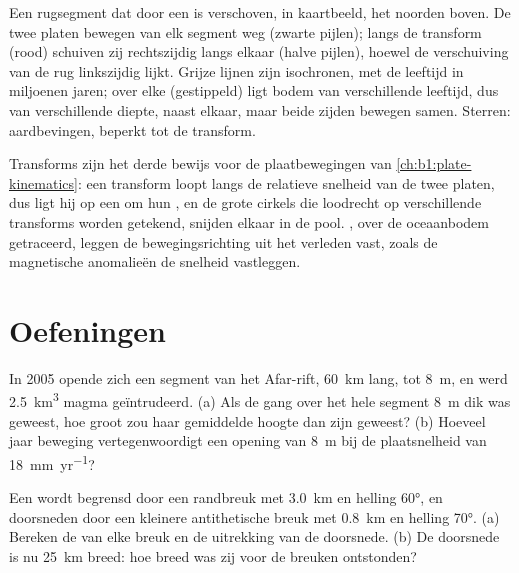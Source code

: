 \begin{omfigure}
{\small Een rugsegment dat door een  is verschoven, in kaartbeeld, het noorden boven. De twee platen bewegen van elk segment weg (zwarte pijlen); langs de transform (rood) schuiven zij rechtszijdig langs elkaar (halve pijlen), hoewel de verschuiving van de rug linkszijdig lijkt. Grijze lijnen zijn isochronen, met de leeftijd in miljoenen jaren; over elke  (gestippeld) ligt bodem van verschillende leeftijd, dus van verschillende diepte, naast elkaar, maar beide zijden bewegen samen. Sterren: aardbevingen, beperkt tot de transform.}
\label{fig:b1:rifts-ridges-margins:transform}
\end{omfigure}

Transforms zijn het derde bewijs voor de plaatbewegingen van \cref{ch:b1:plate-kinematics}: een transform loopt langs de relatieve snelheid van de twee platen, dus ligt hij op een  om hun , en de grote cirkels die loodrecht op verschillende transforms worden getekend, snijden elkaar in de pool. , over de oceaanbodem getraceerd, leggen de bewegingsrichting uit het verleden vast, zoals de magnetische anomalieën de snelheid vastleggen.

\section{Oefeningen}

\begin{exercise}[$\star$]\label{exo:b1:rifts-ridges-margins:1}
In 2005 opende zich een segment van het Afar-rift, \qty{60}{km} lang, tot \qty{8}{m}, en werd \qty{2.5}{km^3} magma geïntrudeerd. (a) Als de gang over het hele segment \qty{8}{m} dik was geweest, hoe groot zou haar gemiddelde hoogte dan zijn geweest? (b) Hoeveel jaar beweging vertegenwoordigt een opening van \qty{8}{m} bij de plaatsnelheid van \qty{18}{mm.yr^{-1}}?
\end{exercise}

\begin{exercise}[$\star$]\label{exo:b1:rifts-ridges-margins:2}
Een  wordt begrensd door een randbreuk met  \qty{3.0}{km} en helling \ang{60}, en doorsneden door een kleinere antithetische breuk met  \qty{0.8}{km} en helling \ang{70}. (a) Bereken de  van elke breuk en de uitrekking van de doorsnede. (b) De doorsnede is nu \qty{25}{km} breed: hoe breed was zij voor de breuken ontstonden?
\end{exercise}

